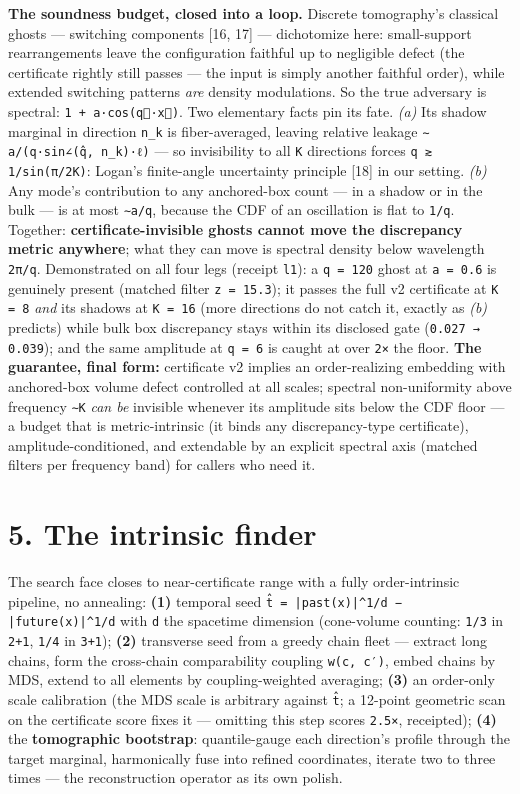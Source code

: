 \documentclass[11pt]{article}
\begin{document}
\textbf{The soundness budget, closed into a loop.} Discrete tomography's classical ghosts — switching components [16, 17] — dichotomize here: small-support rearrangements leave the configuration faithful up to negligible defect (the certificate rightly still passes — the input is simply another faithful order), while extended switching patterns \emph{are} density modulations. So the true adversary is spectral: \texttt{1 + a·cos(q⃗·x⃗)}. Two elementary facts pin its fate. \emph{(a)} Its shadow marginal in direction \texttt{n\_k} is fiber-averaged, leaving relative leakage \texttt{∼ a/(q·sin∠(q̂, n\_k)·ℓ)} — so invisibility to all \texttt{K} directions forces \texttt{q ≳ 1/sin(π/2K)}: Logan's finite-angle uncertainty principle [18] in our setting. \emph{(b)} Any mode's contribution to any anchored-box count — in a shadow or in the bulk — is at most \texttt{∼a/q}, because the CDF of an oscillation is flat to \texttt{1/q}. Together: \textbf{certificate-invisible ghosts cannot move the discrepancy metric anywhere}; what they can move is spectral density below wavelength \texttt{2π/q}. Demonstrated on all four legs (receipt \texttt{l1}): a \texttt{q = 120} ghost at \texttt{a = 0.6} is genuinely present (matched filter \texttt{z = 15.3}); it passes the full v2 certificate at \texttt{K = 8} \emph{and} its shadows at \texttt{K = 16} (more directions do not catch it, exactly as \emph{(b)} predicts) while bulk box discrepancy stays within its disclosed gate (\texttt{0.027 → 0.039}); and the same amplitude at \texttt{q = 6} is caught at over \texttt{2×} the floor. \textbf{The guarantee, final form:} certificate v2 implies an order-realizing embedding with anchored-box volume defect controlled at all scales; spectral non-uniformity above frequency \texttt{∼K} \emph{can be} invisible whenever its amplitude sits below the CDF floor — a budget that is metric-intrinsic (it binds any discrepancy-type certificate), amplitude-conditioned, and extendable by an explicit spectral axis (matched filters per frequency band) for callers who need it.

\section*{5. The intrinsic finder}
The search face closes to near-certificate range with a fully order-intrinsic pipeline, no annealing: \textbf{(1)} temporal seed \texttt{t̂ = |past(x)|\textasciicircum{}{1/d} − |future(x)|\textasciicircum{}{1/d}} with \texttt{d} the spacetime dimension (cone-volume counting: \texttt{1/3} in \texttt{2+1}, \texttt{1/4} in \texttt{3+1}); \textbf{(2)} transverse seed from a greedy chain fleet — extract long chains, form the cross-chain comparability coupling \texttt{w(c, c′)}, embed chains by MDS, extend to all elements by coupling-weighted averaging; \textbf{(3)} an order-only scale calibration (the MDS scale is arbitrary against \texttt{t̂}; a 12-point geometric scan on the certificate score fixes it — omitting this step scores \texttt{2.5×}, receipted); \textbf{(4)} the \textbf{tomographic bootstrap}: quantile-gauge each direction's profile through the target marginal, harmonically fuse into refined coordinates, iterate two to three times — the reconstruction operator as its own polish.
\end{document}
